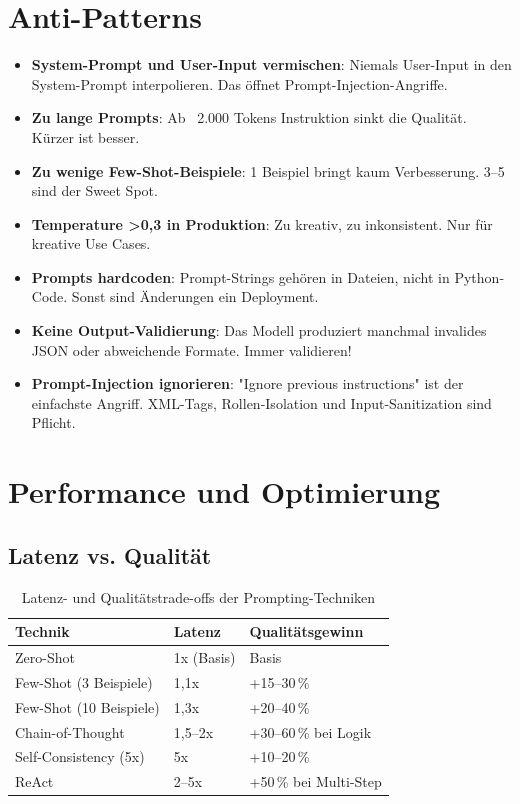 \section{Anti-Patterns}

\begin{itemize}[leftmargin=*]
    \item \textbf{System-Prompt und User-Input vermischen}: Niemals User-Input in den System-Prompt interpolieren. Das öffnet Prompt-Injection-Angriffe.
    \item \textbf{Zu lange Prompts}: Ab ~2.000 Tokens Instruktion sinkt die Qualität. Kürzer ist besser.
    \item \textbf{Zu wenige Few-Shot-Beispiele}: 1 Beispiel bringt kaum Verbesserung. 3--5 sind der Sweet Spot.
    \item \textbf{Temperature >0,3 in Produktion}: Zu kreativ, zu inkonsistent. Nur für kreative Use Cases.
    \item \textbf{Prompts hardcoden}: Prompt-Strings gehören in Dateien, nicht in Python-Code. Sonst sind Änderungen ein Deployment.
    \item \textbf{Keine Output-Validierung}: Das Modell produziert manchmal invalides JSON oder abweichende Formate. Immer validieren!
    \item \textbf{Prompt-Injection ignorieren}: "Ignore previous instructions" ist der einfachste Angriff. XML-Tags, Rollen-Isolation und Input-Sanitization sind Pflicht.
\end{itemize}

\section{Performance und Optimierung}

\subsection{Latenz vs. Qualität}

\begin{table}[H]
\centering
\begin{tabularx}{\linewidth}{lXX}
\toprule
\textbf{Technik} & \textbf{Latenz} & \textbf{Qualitätsgewinn} \\
\midrule
Zero-Shot & 1x (Basis) & Basis \\
Few-Shot (3 Beispiele) & 1,1x & +15--30\,\% \\
Few-Shot (10 Beispiele) & 1,3x & +20--40\,\% \\
Chain-of-Thought & 1,5--2x & +30--60\,\% bei Logik \\
Self-Consistency (5x) & 5x & +10--20\,\% \\
ReAct & 2--5x & +50\,\% bei Multi-Step \\
\midrule
\end{tabularx}
\caption{Latenz- und Qualitätstrade-offs der Prompting-Techniken}
\label{tab:latency-quality}
\end{table}

